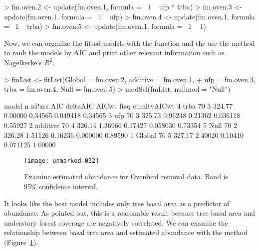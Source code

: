 \documentclass[article,shortnames]{jss}
\begin{document}
\begin{Schunk}
\begin{Sinput}
> fm.oven.2 <- update(fm.oven.1, formula = ~1 ~ ufp * trba)
> fm.oven.3 <- update(fm.oven.1, formula = ~1 ~ ufp)
> fm.oven.4 <- update(fm.oven.1, formula = ~1 ~ trba)
> fm.oven.5 <- update(fm.oven.1, formula = ~1 ~ 1)
\end{Sinput}
\end{Schunk}


Now, we can organize the fitted models with the  function and
the use the  method to rank the models by AIC and print
other relevant information such as Nagelkerke's
\citeyearpar{Nagelkerke1991} $R^{2}$.



\begin{Schunk}
\begin{Sinput}
> fmList <- fitList(Global = fm.oven.2, additive = fm.oven.1, 
+     ufp = fm.oven.3, trba = fm.oven.4, Null = fm.oven.5)
> modSel(fmList, nullmod = "Null")
\end{Sinput}
\begin{Soutput}
     model  n nPars    AIC deltaAIC   AICwt      Rsq cumltvAICwt
4     trba 70     3 324.77  0.00000 0.34565 0.049418     0.34565
3      ufp 70     3 325.73  0.96248 0.21362 0.036118     0.55927
2 additive 70     4 326.14  1.36966 0.17427 0.058030     0.73354
5     Null 70     2 326.28  1.51126 0.16236 0.000000     0.89590
1   Global 70     5 327.17  2.40020 0.10410 0.071125     1.00000
\end{Soutput}
\end{Schunk}


\begin{figure}[ht]
  \centering
\texttt{[image: unmarked-032]}
\caption{Examine estimated abundance for Ovenbird removal data.  Band
  is 95\% confidence interval.}
\label{fig:pred}
\end{figure}


It looks like the best model includes only tree basal area as a
predictor of abundance.  As \citet{Royle2004a} pointed out, this is a
reasonable result because tree basal area and understory forest
coverage are negatively correlated.  We can examine the relationship
between basal tree area and estimated abundance
with the  method (Figure~\ref{fig:pred}).
\end{document}
